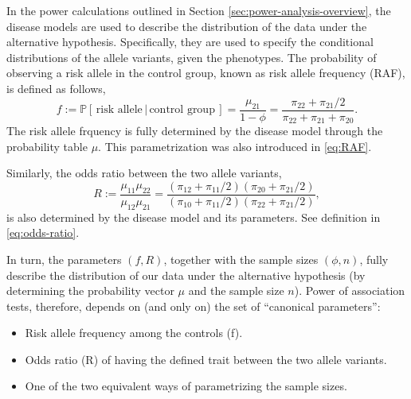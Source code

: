 


In the power calculations outlined in Section \ref{sec:power-analysis-overview}, the disease models are used to describe the distribution of the data under the alternative hypothesis.
Specifically, they are used to specify the conditional distributions of the allele variants, given the phenotypes.
The probability of observing a risk allele in the control group, known as risk allele frequency (RAF), is defined as follows,
\begin{equation}
    f := \mathbb{P}[\,\text{risk allele}\,|\,\text{control group}\,] 
    = \frac{\mu_{21}}{1-\phi} 
    = \frac{\pi_{22} + \pi_{21}/2}{\pi_{22} + \pi_{21} + \pi_{20}}.
\end{equation}
The risk allele frquency is fully determined by the disease model through the probability table $\mu$. This parametrization was also introduced in \eqref{eq:RAF}.

Similarly, the odds ratio between the two allele variants, 
\begin{equation}
    R:=\frac{\mu_{11}\mu_{22}}{\mu_{12}\mu_{21}} 
    = \frac{(\pi_{12} + \pi_{11}/2)(\pi_{20} + \pi_{21}/2)}{(\pi_{10} + \pi_{11}/2)(\pi_{22} + \pi_{21}/2)},
\end{equation}
is also determined by the disease model and its parameters. See definition in \eqref{eq:odds-ratio}.

In turn, the parameters $(f, R)$, together with the sample sizes $(\phi, n)$, fully describe the distribution of our data under the alternative hypothesis (by determining the probability vector $\mu$ and the sample size $n$).
Power of association tests, therefore, depends on (and only on) the set of ``canonical parameters'':

\begin{itemize}
    \item Risk allele frequency among the controls (f).
    \item Odds ratio (R) of having the defined trait between the two allele variants.
    \item One of the two equivalent ways of parametrizing the sample sizes.
\end{itemize}

